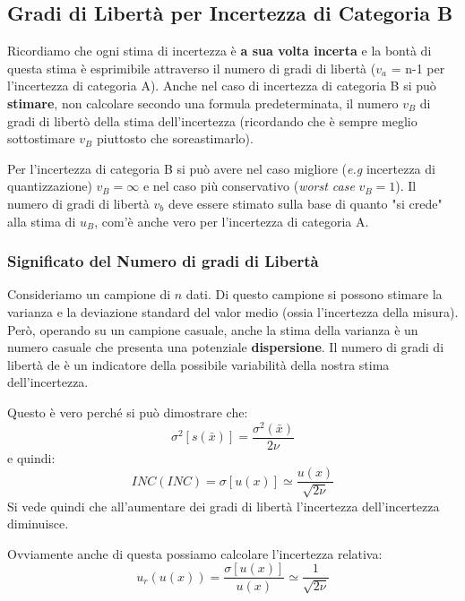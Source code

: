 \documentclass[a4paper,11pt]{report}
\begin{document}
\subsection{Gradi di Libertà per Incertezza di Categoria B}
Ricordiamo che ogni stima di incertezza è \textbf{a sua volta incerta} e la bontà di questa stima è esprimibile attraverso il numero di gradi di libertà ($v_a$ = n-1 per l'incertezza di categoria A).
Anche nel caso di incertezza di categoria B si può \textbf{stimare}, non calcolare secondo una formula predeterminata, il numero $v_B$ di gradi di libertò della stima dell'incertezza (ricordando che è sempre meglio sottostimare $v_B$ piuttosto che soreastimarlo).

Per l'incertezza di categoria B si può avere nel caso migliore (\textit{e.g} incertezza di quantizzazione) $v_B = \infty$ e nel caso più conservativo (\textit{worst case} $v_B = 1$).
Il numero di gradi di libertà $v_b$ deve essere stimato sulla base di quanto "si crede" alla stima di $u_B$, com'è anche vero per l'incertezza di categoria A.
\subsubsection{Significato del Numero di gradi di Libertà}
Consideriamo un campione di $n$ dati. Di questo campione si possono stimare la varianza e la deviazione standard del valor medio (ossia l'incertezza della misura). Però, operando su un campione casuale, anche la stima della varianza è un numero casuale che presenta una potenziale \textbf{dispersione}. Il numero di gradi di libertà de è un indicatore della possibile variabilità della nostra stima dell'incertezza.

Questo è vero perché si può dimostrare che:
$$
  \sigma^2[s(\bar{x})] = \frac{\sigma^2(\bar{x})}{2\nu}
$$
e quindi:
$$
  INC(INC) = \sigma[u(x)] \simeq \frac{u(x)}{\sqrt{2\nu}}
$$
Si vede quindi che all'aumentare dei gradi di libertà l'incertezza dell'incertezza diminuisce.

Ovviamente anche di questa possiamo calcolare l'incertezza relativa:
$$
  u_r(u(x)) = \frac{\sigma[u(x)]}{u(x)} \simeq \frac{1}{\sqrt{2\nu}}
$$
\end{document}
